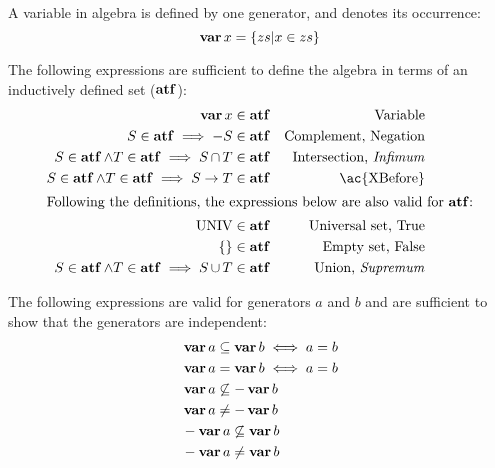 \documentclass[12pt,openright,twoside,a4paper,oldfontcommands,english,brazil,final]{abntex2}
\theoremstyle{theo}
\def\varop{\ensuremath\operatorname{\mathbf{var}}}
\newcommand{\var}[1]{\ensuremath\varop #1}
\def\xbeforeop{\ensuremath\rightarrow}
\newcommand{\xbefore}[2]{\ensuremath #1 \xbeforeop #2 }
\def\True{\ensuremath\operatorname{UNIV}}
\def\False{\ensuremath\operatorname{\left\{\right\}}}
\def\algebraset{\ensuremath\operatorname{\mathbf{atf}}}
\newcommand{\setsin}[1]{\ensuremath\left\{ #1 \right\}}
\def\union{\ensuremath\operatorname{\cup}}
\def\inter{\ensuremath\operatorname{\cap}}
\begin{document}
A variable in \ac{algebra} is defined by one generator, and denotes its occurrence:
%
\begin{equation}
\label{def:var}
\var{x} =
  \setsin{
    zs | x \in zs
  }
\end{equation}

The following expressions are sufficient to define the \ac{algebra} in terms of an inductively defined set ($\algebraset$):
%
\begin{subequations}
\label{def:algebraset}
\begin{align}
\var x & \in \algebraset & \text{Variable}\label{def:algebraset-var}\\
S \in \algebraset \implies -S & \in \algebraset & \text{Complement, Negation}\label{def:algebraset-compl}\\
S \in \algebraset \land T \in \algebraset \implies S \inter T & \in \algebraset & \text{Intersection, \emph{Infimum}}\label{def:algebraset-inf}\\
S \in \algebraset \land T \in \algebraset \implies \xbefore{S}{T} & \in \algebraset & \text{\ac{XBefore}}\label{def:algebraset-xbefore}\\
\intertext{Following the definitions, the expressions below are also valid for $\algebraset$:}
\True &\in \algebraset & \text{Universal set, True}\label{def:algebraset-true}\\
\False &\in \algebraset & \text{Empty set, False}\label{def:algebraset-false}\\
S \in \algebraset \land T \in \algebraset \implies S \union T &\in \algebraset & \text{Union, \emph{Supremum}}\label{def:algebraset-sup}
\end{align}
\end{subequations}

The following expressions are valid for generators $a$ and $b$ and are sufficient to show that the generators are independent:
%
\begin{subequations}
\label{eqs:generators-independence}
\begin{align}
&\var a \subseteq \var b \iff a = b\label{eqs:generators-independence-subseteq-eq}\\
&\var a = \var b \iff a = b\\
&\var a \not\subseteq - \var b\\
&\var a \neq -\var b\label{eqs:generators-independence-subseteq-neq-compl} \\
&- \var a \not\subseteq \var b\\
&- \var a \neq \var b\label{eqs:generators-independence-subseteq-compl-neq}
\end{align}
\end{subequations}
\end{document}
